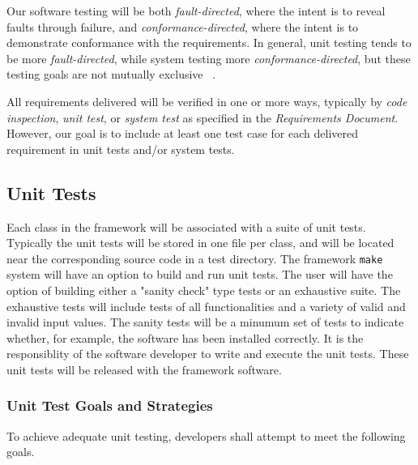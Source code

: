 Our software testing will be both {\it fault-directed}, where the intent 
is to reveal faults through failure, and {\it conformance-directed}, 
where the intent is to demonstrate conformance with the 
requirements. In general, unit testing tends to be more 
{\it fault-directed}, while system testing more {\it conformance-directed}, 
but these testing goals are not mutually exclusive ~\cite{binder}. 

All requirements delivered will be verified in one or more ways, typically by 
{\it code inspection}, {\it unit test}, or {\it system test} as specified
in the {\it Requirements Document}. However, our goal is to include at 
least one test case for each delivered requirement in unit tests and/or 
system tests.

\subsection{Unit Tests}

Each class in the framework will be associated with a suite of unit tests.
Typically the unit tests will be stored in one file per class, and will be 
located near the corresponding source code in a test directory.  The 
framework {\tt make} system will have an option to build and run unit tests.
The user will have the option of building either a "sanity check" type tests
or an exhaustive suite. The exhaustive tests will include tests of all 
functionalities and a variety of valid and invalid input values. The sanity 
tests will be a minumum set of tests to indicate whether, for example, the 
software has been installed correctly. It is the responsiblity of the 
software developer to write and execute the unit tests. These unit tests 
will be released with the framework software.

\subsubsection{Unit Test Goals and Strategies}

To achieve adequate unit testing, developers shall attempt to meet the following goals. 

